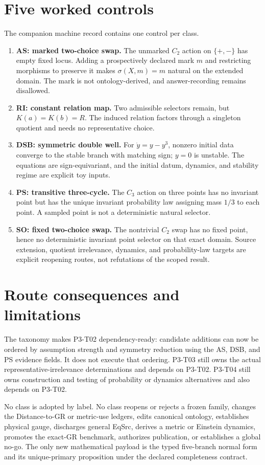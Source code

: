\documentclass[11pt]{article}
\begin{document}
\section{Five worked controls}

The companion machine record contains one control per class.
\begin{enumerate}
  \item \textbf{AS: marked two-choice swap.}  The unmarked $C_2$ action on
        $\{+,-\}$ has empty fixed locus.  Adding a prospectively declared mark
        $m$ and restricting morphisms to preserve it makes $\sigma(X,m)=m$
        natural on the extended domain.  The mark is not ontology-derived,
        and answer-recording remains disallowed.
  \item \textbf{RI: constant relation map.}  Two admissible selectors remain,
        but $K(a)=K(b)=R$.  The induced relation factors through a singleton
        quotient and needs no representative choice.
  \item \textbf{DSB: symmetric double well.}  For
        $\dot y=y-y^3$, nonzero initial data converge to the stable branch
        with matching sign; $y=0$ is unstable.  The equations are
        sign-equivariant, and the initial datum, dynamics, and stability
        regime are explicit toy inputs.
  \item \textbf{PS: transitive three-cycle.}  The $C_3$ action on three points
        has no invariant point but has the unique invariant probability law
        assigning mass $1/3$ to each point.  A sampled point is not a
        deterministic natural selector.
  \item \textbf{SO: fixed two-choice swap.}  The nontrivial $C_2$ swap has no
        fixed point, hence no deterministic invariant point selector on that
        exact domain.  Source extension, quotient irrelevance, dynamics, and
        probability-law targets are explicit reopening routes, not refutations
        of the scoped result.
\end{enumerate}

\section{Route consequences and limitations}

The taxonomy makes P3-T02 dependency-ready: candidate additions can now be
ordered by assumption strength and symmetry reduction using the AS, DSB, and
PS evidence fields.  It does not execute that ordering.  P3-T03 still owns the
actual representative-irrelevance determinations and depends on P3-T02.
P3-T04 still owns construction and testing of probability or dynamics
alternatives and also depends on P3-T02.

No class is adopted by label.  No class reopens or rejects a frozen family,
changes the Distance-to-GR or metric-use ledgers, edits canonical ontology,
establishes physical gauge, discharges general EqSrc, derives a metric or
Einstein dynamics, promotes the exact-GR benchmark, authorizes publication,
or establishes a global no-go.  The only new mathematical payload is the
typed five-branch normal form and its unique-primary proposition under the
declared completeness contract.
\end{document}
